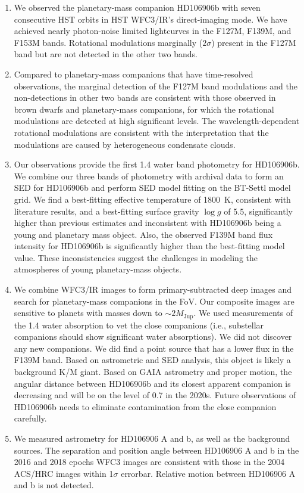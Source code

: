 \documentclass[twocolumn]{aastex62}
\newcommand{\mjup}{\ensuremath{M_\mathrm{Jup}}\xspace}
\begin{document}
\begin{enumerate}
\item We observed the planetary-mass companion HD106906b with seven consecutive HST orbits in HST WFC3/IR's direct-imaging mode. We have achieved nearly photon-noise limited  lightcurves in the F127M, F139M, and F153M bands. Rotational modulations marginally ($2\sigma$) present in the F127M band but are not detected in the other two bands.

\item Compared to planetary-mass companions that have time-resolved observations, the marginal detection of the F127M band modulations and the non-detections in other two bands are consistent with those observed in brown dwarfs and planetary-mass companions, for which the rotational modulations are detected at high significant levels. The wavelength-dependent rotational modulations are consistent with the interpretation that the modulations are caused by heterogeneous condensate clouds.

\item Our observations provide the first 1.4 \micron{} water band photometry for HD106906b. We combine our three bands of photometry with archival data to form an SED for HD106906b and perform SED model fitting on the BT-Settl model grid. We find a best-fitting effective temperature of 1800~K, consistent with literature results, and a best-fitting surface gravity $\log g$ of 5.5,  significantly higher than previous estimates and inconsistent with HD106906b being a young and planetary mass object. Also, the observed F139M band flux intensity for HD106906b is significantly higher than the best-fitting model value. These inconsistencies suggest the challenges in modeling the atmospheres of young planetary-mass objects.

\item We combine WFC3/IR images to form primary-subtracted deep images and search for planetary-mass companions in the FoV. Our composite images are sensitive to planets with masses down to $\sim 2 \mjup$. We used measurements of the 1.4\micron{} water absorption to vet the close companions (i.e., substellar companions should show significant water absorptions). We did not discover  any new companions. We did find a point source that has a lower flux in the F139M band. Based on astrometric and SED analysis, this object is likely a background K/M giant.  Based on GAIA astrometry and proper motion, the angular distance between HD106906b and its closest apparent companion is decreasing and will be on the level of 0.7\arcsec{}  in the 2020s. Future observations of HD106906b needs to eliminate contamination from the close companion carefully.

\item We measured astrometry for HD106906 A and b, as well as the background sources. The separation and position angle between HD106906 A and b in the 2016 and 2018 epochs WFC3 images are consistent with those in the 2004 ACS/HRC images within 1$\sigma$ errorbar. Relative motion between HD106906 A and b is not detected. 
\end{enumerate}
\end{document}
